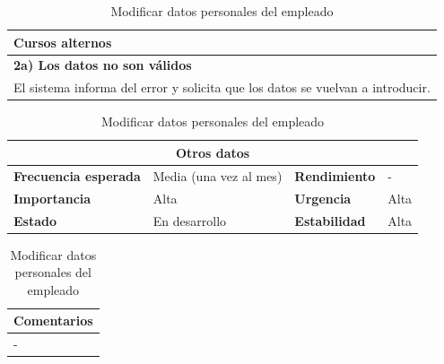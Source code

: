 \documentclass[12pt,spanish]{article}
\begin{document}
\begin{table}[H]
\vspace{1cm}

\begin{tabular}{|m{10pt}|m{7.15cm}|m{10pt}|m{7.15cm}|}
\hline
\multicolumn{4}{|m{16.2cm}|}{\textbf{Cursos alternos}} \\
\hline
\multicolumn{4}{|m{16.2cm}|}{\textbf{2a) Los datos no son válidos}} \\
\hline
\multicolumn{4}{|m{16.2cm}|}{El sistema informa del error y solicita que los datos se vuelvan a introducir.} \\
\hline
\end{tabular}

\vspace{1cm}

\begin{tabular}{|m{3.72cm}|m{3.72cm}|m{3.72cm}|m{3.72cm}|}
\hline
\multicolumn{4}{|c|}{\textbf{Otros datos}} \\
\hline
\textbf{Frecuencia esperada} & Media (una vez al mes) & \textbf{Rendimiento} & - \\
\hline
\textbf{Importancia} & Alta & \textbf{Urgencia} & Alta \\
\hline
\textbf{Estado} & En desarrollo & \textbf{Estabilidad} & Alta \\
\hline
\end{tabular}

\vspace{1cm}

\begin{tabular}{|m{16.2cm}|}
\hline
\textbf{Comentarios} \\
\hline
- \\
\hline
\end{tabular}

\caption{Modificar datos personales del empleado}

\end{table}

\end{document}
